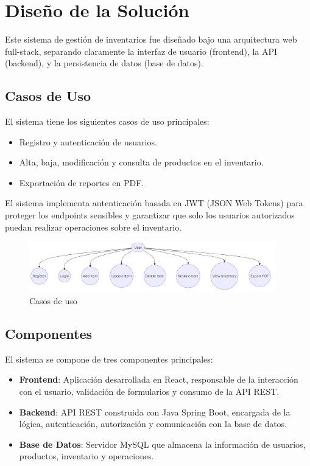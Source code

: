 \section{Diseño de la Solución}

Este sistema de gestión de inventarios fue diseñado bajo una arquitectura web full-stack, separando claramente la interfaz de usuario (frontend), la API (backend), y la persistencia de datos (base de datos).

\subsection{Casos de Uso}

El sistema tiene los siguientes casos de uso principales:

\begin{itemize}
    \item Registro y autenticación de usuarios.
    \item Alta, baja, modificación y consulta de productos en el inventario.
    \item Exportación de reportes en PDF.
\end{itemize}

El sistema implementa autenticación basada en JWT (JSON Web Tokens) para proteger los endpoints sensibles y garantizar que solo los usuarios autorizados puedan realizar operaciones sobre el inventario.

\begin{figure}[H]
    \centering
    \includegraphics[width=0.95\textwidth]{diagrams/usecase}
    \caption{Casos de uso}
\end{figure}

\subsection{Componentes}

El sistema se compone de tres componentes principales:

\begin{itemize}
    \item \textbf{Frontend}: Aplicación desarrollada en React, responsable de la interacción con el usuario, validación de formularios y consumo de la API REST.
    \item \textbf{Backend}: API REST construida con Java Spring Boot, encargada de la lógica, autenticación, autorización y comunicación con la base de datos.
    \item \textbf{Base de Datos}: Servidor MySQL que almacena la información de usuarios, productos, inventario y operaciones.
\end{itemize}

